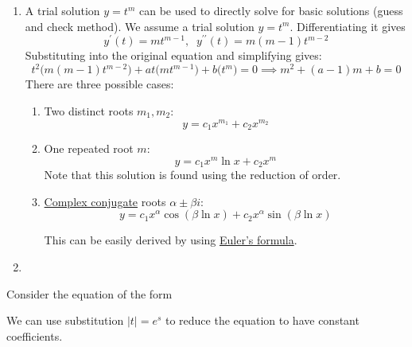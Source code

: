 \documentclass{article}
\begin{document}
      \begin{enumerate}
          \item A trial solution $y = t^m$ can be used to directly solve for basic solutions (guess and check method). We assume a trial solution $y = t^m$. Differentiating it gives
          \begin{equation}
            y^\prime (t) = m t^{m-1}, \;\; y^{\prime\prime} (t) = m (m-1) t^{m-2}
          \end{equation}
          Substituting into the original equation and simplifying gives: 
          \begin{equation}
            t^2 \big( m(m-1)t^{m-2}\big) + at \big( m t^{m-1}\big) + b \big( t^m \big) = 0 \implies m^2 + (a-1) m + b = 0
          \end{equation}
          There are three possible cases: 
          \begin{enumerate}
              \item Two distinct roots $m_1, m_2$: 
              \begin{equation}
                y = c_1 x^{m_1} + c_2 x^{m_2}
              \end{equation}
              \item One repeated root $m$: 
              \begin{equation}
                y = c_1 x^m \ln{x} + c_2 x^m
              \end{equation}
              Note that this solution is found using the reduction of order. 
              \item \hyperref[cx-def:complex-conjugate]{Complex conjugate} roots $\alpha \pm \beta i$: 
              \begin{equation}
                y = c_1 x^{\alpha} \cos(\beta \ln{x}) + c_2 x^\alpha \sin(\beta \ln{x})
              \end{equation}
               
              This can be easily derived by using \hyperref[cx-def:eulers-formula]{Euler's formula}. 
          \end{enumerate}
          \item 
      \end{enumerate}


      Consider the equation of the form 

      We can use substitution $|t| = e^s$ to reduce the equation to have constant coefficients. 
\end{document}
